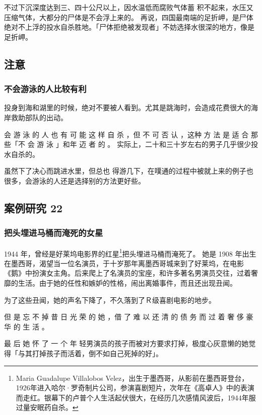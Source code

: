 \documentclass[UTF8]{ctexart}
\begin{document}
不过下沉深度达到三、四十公尺以上，因水温低而腐败气体蓄 积不起来，水压又压缩气体，大都分的尸体是不会浮上来的。 再说，四国最南端的足折岬，是尸体绝对不上浮的投水自杀胜地。「尸体拒绝被发现者」不妨选择水很深的地方，像是足折岬。



\subsection{注意}

\subsubsection*{不会游泳的人比较有利}

投身到海和湖里的时候，绝对不要被人看到。尤其是跳海时，会造成花费很大的海岸救助部队的出动。

会 游 泳 的 人 也 有 可 能 这 样 自 杀 ，但 不 可 否 认 ，这种 方 法 是 适 合 那 些「不 会 游 泳 」和年 迈 者 的 。 实际上，二十和三十岁左右的男子几乎很少投水自杀的。

虽然下了决心而跳进水里，但总也 得游几下，在噗通的过程中被就上来的例子也很多，会游泳的人还是选择别的方法更好些。





\subsection{案例研究 22}

\subsubsection*{把头埋进马桶而淹死的女星}

1944 年，曾经是好莱坞电影界的红星\footnote{Maria Guadalupe Villalobos Velez，出生于墨西哥，从影前在墨西哥登台，1926年进入哈尔·罗奇制片公司，参演喜剧短片，次年在《高卓人》中的表演而走红。银幕下的卢普个人生活起伏很大，在经历几次感情风波后，1944年服过量安眠药自杀。}把头埋进马桶而淹死了。
她是 1908 年出生在墨西哥，渴望当一位名演员，于十岁那年离墨西哥城来到了好莱坞，在电影《鹅》中扮演女主角。后来爬上了名演员的宝座，和许多著名男演员交往，过着奢靡的生活。由于她的任性和嫉妒的性格，闹出离婚事件，而且还出现丑闻。

为了这些丑闻，她的声名下降了，不久落到了Ｒ级喜剧电影的地步。

但 是 忘 不 掉 昔 日 光 荣 的 她 ，借 了 难 以 还 清 的 债 务 而 过 着 奢 侈 豪 华 的 生 活 。

最 后 她 怀 了 一 个 年 轻男演员的孩子而被对方要求打掉，极度心灰意懒的她觉得「与其打掉孩子而活着，倒不如自己死掉的好」。
\end{document}
